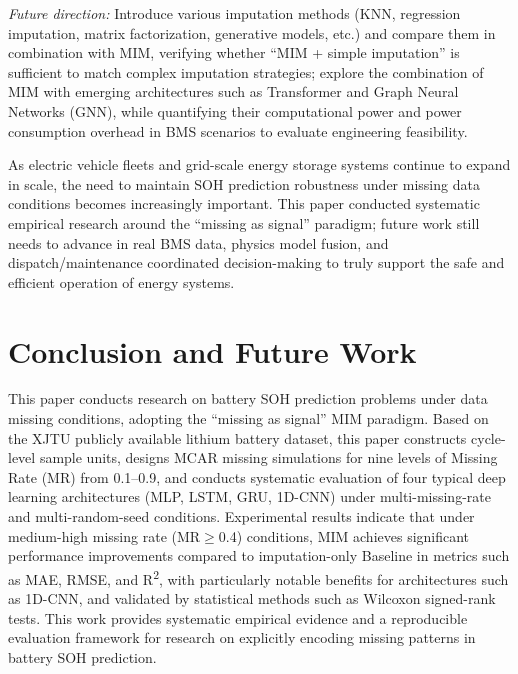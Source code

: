\documentclass[10pt,a4paper]{article}
\begin{document}
\textit{Future direction:} Introduce various imputation methods (KNN, regression imputation, matrix factorization, generative models, etc.) and compare them in combination with MIM, verifying whether ``MIM + simple imputation'' is sufficient to match complex imputation strategies; explore the combination of MIM with emerging architectures such as Transformer and Graph Neural Networks (GNN), while quantifying their computational power and power consumption overhead in BMS scenarios to evaluate engineering feasibility.

As electric vehicle fleets and grid-scale energy storage systems continue to expand in scale, the need to maintain SOH prediction robustness under missing data conditions becomes increasingly important. This paper conducted systematic empirical research around the ``missing as signal'' paradigm; future work still needs to advance in real BMS data, physics model fusion, and dispatch/maintenance coordinated decision-making to truly support the safe and efficient operation of energy systems.


\section{Conclusion and Future Work}\label{sec:conclusion}

This paper conducts research on battery SOH prediction problems under data missing conditions, adopting the ``missing as signal'' MIM paradigm. Based on the XJTU publicly available lithium battery dataset, this paper constructs cycle-level sample units, designs MCAR missing simulations for nine levels of Missing Rate (MR) from 0.1--0.9, and conducts systematic evaluation of four typical deep learning architectures (MLP, LSTM, GRU, 1D-CNN) under multi-missing-rate and multi-random-seed conditions. Experimental results indicate that under medium-high missing rate (MR$\geq$0.4) conditions, MIM achieves significant performance improvements compared to imputation-only Baseline in metrics such as MAE, RMSE, and R\textsuperscript{2}, with particularly notable benefits for architectures such as 1D-CNN, and validated by statistical methods such as Wilcoxon signed-rank tests. This work provides systematic empirical evidence and a reproducible evaluation framework for research on explicitly encoding missing patterns in battery SOH prediction.
\end{document}
